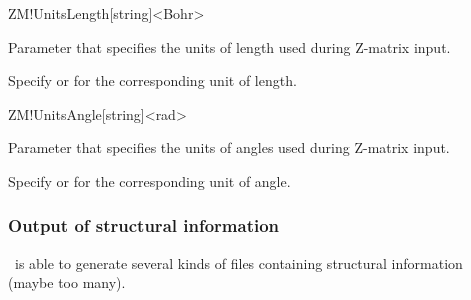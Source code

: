 \begin{fdfentry}{ZM!UnitsLength}[string]<Bohr>

  Parameter that specifies the units of length used during Z-matrix
  input.

  Specify  or  for the corresponding unit of length.
  
\end{fdfentry}

\begin{fdfentry}{ZM!UnitsAngle}[string]<rad>

  Parameter that specifies the units of angles used during Z-matrix input.

  Specify  or  for the corresponding unit of angle.

\end{fdfentry}


\subsubsection{Output of structural information}

\siesta\ is able to generate several kinds of files containing
structural information (maybe too many).

